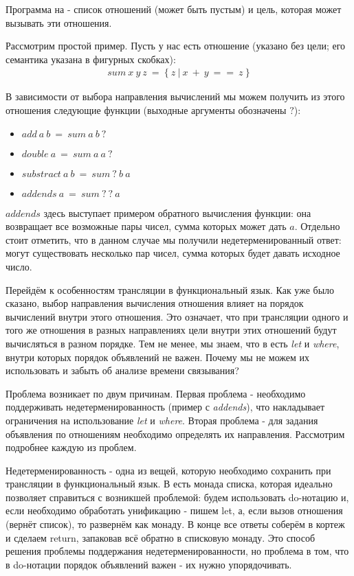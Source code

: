 \documentclass[conference]{IEEEtran}
\begin{document}
Программа на \miniKanren - список отношений (может быть пустым) и цель, которая может вызывать эти отношения.

Рассмотрим простой пример. Пусть у нас есть отношение (указано без цели; его семантика указана в фигурных скобках):
$$\begin{aligned}sum~x~y~z~=~\{~z~|~x~+~y~==~z~\}\end{aligned}$$

В зависимости от выбора направления вычислений мы можем получить из этого отношения следующие функции (выходные аргументы обозначены $?$):
\begin{itemize}
    \item $add~a~b~=~sum~a~b~?$
    \item $double~a~=~sum~a~a~?$
    \item $substract~a~b~=~sum~?~b~a$
    \item $addends~a~=~sum~?~?~a$
\end{itemize}

$addends$ здесь выступает примером обратного вычисления функции: она возвращает все возможные пары чисел, сумма которых может дать $a$. Отдельно стоит отметить, что в данном случае мы получили недетерменированный ответ: могут существовать несколько пар чисел, сумма которых будет давать исходное число.

Перейдём к особенностям трансляции в функциональный язык. Как уже было сказано, выбор направления вычисления отношения влияет на порядок вычислений внутри этого отношения. Это означает, что при трансляции одного и того же отношения в разных направлениях цели внутри этих отношений будут вычисляться в разном порядке. Тем не менее, мы знаем, что в \haskell есть \emph{let} и \emph{where}, внутри которых порядок объявлений не важен. Почему мы не можем их использовать и забыть об анализе времени связывания?

Проблема возникает по двум причинам. Первая проблема - необходимо поддерживать недетерменированность (пример с \emph{addends}), что накладывает ограничения на использование \emph{let} и \emph{where}. Вторая проблема - для задания объявления по отношениям необходимо определять их направления. Рассмотрим подробнее каждую из проблем.

Недетерменированность - одна из вещей, которую необходимо сохранить при трансляции в функциональный язык. В \haskell есть монада списка, которая идеально позволяет справиться с возникшей проблемой: будем использовать do-нотацию и, если необходимо обработать унификацию - пишем let, а, если вызов отношения (вернёт список), то развернём как монаду. В конце все ответы соберём в кортеж и сделаем return, запаковав всё обратно в списковую монаду. Это способ решения проблемы поддержания недетерменированности, но проблема в том, что в do-нотации порядок объявлений важен - их нужно упорядочивать.
\end{document}
